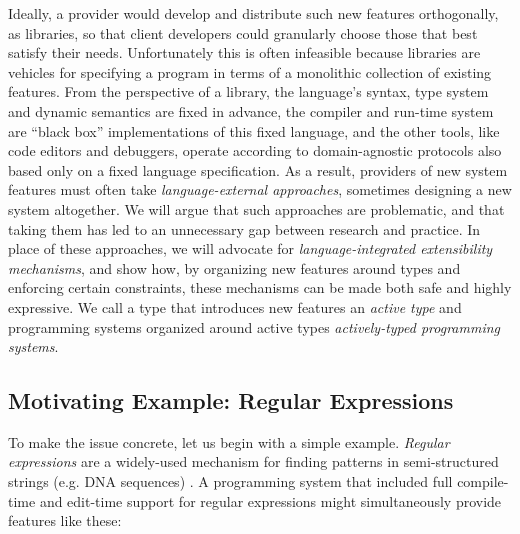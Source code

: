 Ideally, a provider would develop and distribute such new features orthogonally, as libraries, so that client developers could granularly choose those that best satisfy their needs. Unfortunately this is often infeasible because libraries are vehicles for specifying a program in terms of a monolithic collection of existing features. From the perspective of a library, the language's syntax, type system and dynamic semantics are fixed in advance, the compiler and run-time system are ``black box'' implementations of this fixed language, and the other tools, like code editors and debuggers, operate according to domain-agnostic protocols also based only on a fixed language specification. As a result, providers of new system features must often take \emph{language-external approaches}, sometimes designing a new system altogether. We will argue that such approaches are problematic, and that taking them has led to an unnecessary gap between research and practice. In place of these approaches, we will advocate for \emph{language-integrated extensibility mechanisms}, and show how, by organizing new features around {types} and enforcing certain constraints, these mechanisms can be made both safe and highly expressive. We call a type that introduces new features an \emph{active type} and programming systems organized around active types \emph{actively-typed programming systems}.

\subsection{Motivating Example: Regular Expressions}\label{regex}
To make the issue concrete, let us begin with a simple example. \emph{Regular expressions} are a widely-used mechanism for finding patterns in semi-structured strings (e.g. DNA sequences) \cite{Thompson:1968:PTR:363347.363387}. A programming system that included full compile-time and edit-time support for regular expressions might simultaneously provide features like these:

